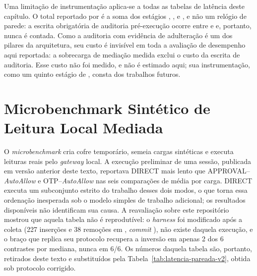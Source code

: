 \documentclass[12pt,openright,twoside,a4paper,english,brazil]{abntex2}
\begin{document}
Uma limitação de instrumentação aplica-se a todas as tabelas de latência deste capítulo. O total reportado por  é a soma dos estágios , ,  e , e não um relógio de parede: a escrita obrigatória de auditoria pré-execução ocorre entre  e  e, portanto, nunca é contada. Como a auditoria com evidência de adulteração é um dos pilares da arquitetura, seu custo é invisível em toda a avaliação de desempenho aqui reportada: a sobrecarga de mediação medida exclui o custo da escrita de auditoria. Esse custo não foi medido, e não é estimado aqui; sua instrumentação, como um quinto estágio de , consta dos trabalhos futuros.

\section{Microbenchmark Sintético de Leitura Local Mediada}
O \textit{microbenchmark} cria cofre temporário, semeia cargas sintéticas e executa leituras reais pelo \textit{gateway} local. A execução preliminar de uma sessão, publicada em versão anterior deste texto, reportava DIRECT mais lento que APPROVAL--\textit{AutoAllow} e OTP--\textit{AutoAllow} nas seis comparações de média por carga. DIRECT executa um subconjunto estrito do trabalho desses dois modos, o que torna essa ordenação inesperada sob o modelo simples de trabalho adicional; os resultados disponíveis não identificam sua causa. A reavaliação sobre este repositório mostrou que aquela tabela não é reprodutível: o \textit{harness} foi modificado após a coleta (227 inserções e 38 remoções em , \textit{commit} ), não existe  daquela execução, e o braço que replica seu protocolo recupera a inversão em apenas 2 dos 6 contrastes por mediana, nunca em 6/6. Os números daquela tabela são, portanto, retirados deste texto e substituídos pela Tabela~\ref{tab:latencia-pareada-v2}, obtida sob protocolo corrigido.
\end{document}
